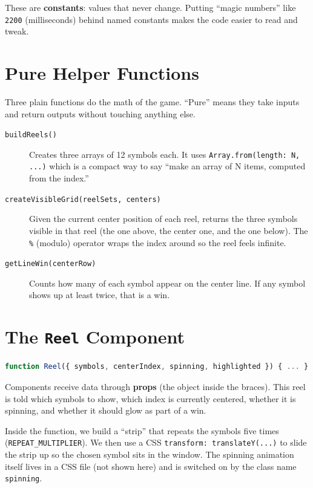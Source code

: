 \documentclass[11pt]{article}
\begin{document}
These are \textbf{constants}: values that never change. Putting ``magic numbers''
like \texttt{2200} (milliseconds) behind named constants makes the code easier to read and tweak.

\section{Pure Helper Functions}

Three plain functions do the math of the game. ``Pure'' means they take
inputs and return outputs without touching anything else.

\begin{description}
  \item[\texttt{buildReels()}] Creates three arrays of 12 symbols each. It uses
  \texttt{Array.from({length: N}, ...)} which is a compact way to say
  ``make an array of N items, computed from the index.''
  \item[\texttt{createVisibleGrid(reelSets, centers)}] Given the current center
  position of each reel, returns the three symbols visible in that reel
  (the one above, the center one, and the one below).
  The \texttt{\%} (modulo) operator wraps the index around so the reel feels infinite.
  \item[\texttt{getLineWin(centerRow)}] Counts how many of each symbol appear on the
  center line. If any symbol shows up at least twice, that is a win.
\end{description}

\section{The \texttt{Reel} Component}

\begin{lstlisting}[language=JavaScript]
function Reel({ symbols, centerIndex, spinning, highlighted }) { ... }
\end{lstlisting}

Components receive data through \textbf{props} (the object inside the braces).
This reel is told which symbols to show, which index is currently centered,
whether it is spinning, and whether it should glow as part of a win.

Inside the function, we build a ``strip'' that repeats the symbols five times
(\texttt{REPEAT\_MULTIPLIER}). We then use a CSS \texttt{transform: translateY(...)}
to slide the strip up so the chosen symbol sits in the window. The spinning
animation itself lives in a CSS file (not shown here) and is switched on by
the class name \texttt{spinning}.
\end{document}
